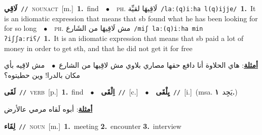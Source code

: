 \documentclass[10pt,a4paper,twoside]{article} %
\begin{document}
\begin{multicols}{2}
{\setlength\topsep{0pt}\textbf{\foreignlanguage{arabic}{لَاقِي}}\ {\color{gray}\texttt{//}\color{black}}\ \textsc{noun\textunderscore act}\ [m.]\ \textbf{1.}~find\ \ $\bullet$\ \ \textsc{ph.} \color{gray} \foreignlanguage{arabic}{لَاقِيهَا لقيِّة}\color{black}\ {\color{gray}\texttt{/{\sffamily laː(q)iːha l(q)ijje}/}\color{black}}\ \textbf{1.}~It is an idiomatic expression that means that sb found what he has been looking for for so long\ \ $\bullet$\ \ \textsc{ph.} \color{gray} \foreignlanguage{arabic}{مش لَاقِيهَا من الشَارع}\color{black}\ {\color{gray}\texttt{/{\sffamily miʃ laː(q)iːha min ʔiʃʃaːriʕ}/}\color{black}}\ \textbf{1.}~It is an idiomatic expression that means that sb paid a lot of money in order to get sth, and that he did not get it for free\  \begin{flushright}\color{gray}\foreignlanguage{arabic}{\textbf{\underline{\foreignlanguage{arabic}{أمثلة}}}: هاي الحلاوة أنا دافع حقها مصاري بلاوي مش لاقِيها من الشارع\ $\bullet$\ \  مش لاقِيه بأي مكان بالدرا! وين حطيتوه؟}\end{flushright}\color{black}} \vspace{2mm}

{\setlength\topsep{0pt}\textbf{\foreignlanguage{arabic}{لَقَى}}\ {\color{gray}\texttt{//}\color{black}}\ \textsc{verb}\ [p.]\ \textbf{1.}~find\ \ $\bullet$\ \ \setlength\topsep{0pt}\textbf{\foreignlanguage{arabic}{اِلْقَى}}\ {\color{gray}\texttt{//}\color{black}}\ [c.]\ \ $\bullet$\ \ \setlength\topsep{0pt}\textbf{\foreignlanguage{arabic}{يِلْقَى}}\ {\color{gray}\texttt{//}\color{black}}\ [i.]\ \color{gray}(msa. \foreignlanguage{arabic}{يَجِد}~\foreignlanguage{arabic}{\textbf{١.}})\color{black}\  \begin{flushright}\color{gray}\foreignlanguage{arabic}{\textbf{\underline{\foreignlanguage{arabic}{أمثلة}}}: أبوه لَقاه مرمي عالأرض}\end{flushright}\color{black}} \vspace{2mm}

{\setlength\topsep{0pt}\textbf{\foreignlanguage{arabic}{لِقَاء}}\ {\color{gray}\texttt{//}\color{black}}\ \textsc{noun}\ [m.]\ \textbf{1.}~meeting  \textbf{2.}~encounter  \textbf{3.}~interview\ } \vspace{2mm}


\end{multicols}
\end{document}

